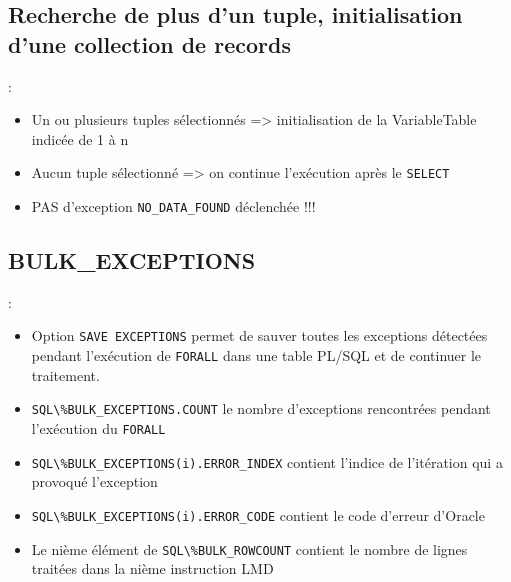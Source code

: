 \documentclass[10pt]{beamer}
\begin{document}
\subsection{Recherche de plus d'un tuple, initialisation d'une collection de records}
\begin{frame}{\secname : \subsecname}
    
    \begin{itemize}
        \item Un ou plusieurs tuples sélectionnés => initialisation de la VariableTable indicée de 1 à n
        \item Aucun tuple sélectionné => on continue l'exécution après le \lstinline[language=plsql]!SELECT!
        \item PAS d'exception \lstinline[language=plsql]!NO_DATA_FOUND! déclenchée !!!
    \end{itemize}
\end{frame}

\subsection{BULK\_EXCEPTIONS}
\begin{frame}{\secname : \subsecname}
    \begin{itemize}
        \item Option \lstinline[language=plsql]!SAVE EXCEPTIONS! permet de sauver toutes les exceptions détectées pendant l’exécution de \lstinline[language=plsql]!FORALL! dans une table PL/SQL et de continuer le traitement.
        \item \lstinline[language=plsql]!SQL\%BULK_EXCEPTIONS.COUNT! le nombre d’exceptions rencontrées pendant l’exécution du \lstinline[language=plsql]!FORALL!
        \item \lstinline[language=plsql]!SQL\%BULK_EXCEPTIONS(i).ERROR_INDEX! contient l’indice de l’itération qui a provoqué l’exception
        \item \lstinline[language=plsql]!SQL\%BULK_EXCEPTIONS(i).ERROR_CODE! contient le code d’erreur d’Oracle
        \item Le nième élément de \lstinline[language=plsql]!SQL\%BULK_ROWCOUNT! contient le nombre de lignes traitées dans la nième instruction LMD
    \end{itemize}
\end{frame}
\end{document}
